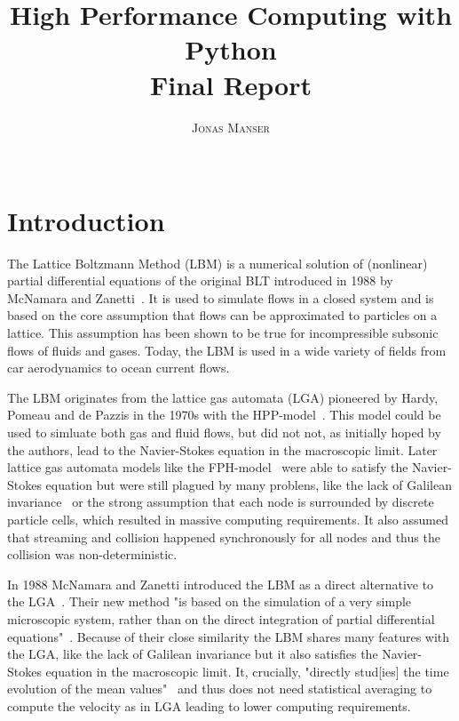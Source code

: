 \documentclass[a4paper,11pt, oneside]{book}
\title{\Huge \textbf{High Performance Computing with Python} \vspace{4mm} \\ \huge Final Report}
\author{\textsc{Jonas Manser} \\ \vspace{3mm}\text{4953222}  \\
\vspace{3mm}\text{jonas.burster@gmail.com}}
\begin{document}


\tableofcontents
\clearpage


\chapter{Introduction}
The Lattice Boltzmann Method (LBM) is a numerical solution of (nonlinear) partial differential equations of the original BLT introduced in 1988 by McNamara and Zanetti~\cite{mcnamara1988boltzmann-method}.
It is used to simulate flows in a closed system and is based on the core assumption that flows can be approximated to particles on a lattice.
This assumption has been shown to be true for incompressible subsonic flows of fluids and gases.
Today, the LBM is used in a wide variety of fields from car aerodynamics to ocean current flows.

The LBM originates from the lattice gas automata (LGA) pioneered by Hardy, Pomeau and de Pazzis in the 1970s with the HPP-model~\cite{hardy1973timeHPP}.
This model could be used to simluate both gas and fluid flows, but did not not, as initially hoped by the authors, lead to the Navier-Stokes equation in the macroscopic limit.
Later lattice gas automata models like the FPH-model~\cite{PhysRevLett.56.1505-fhp} were able to satisfy the Navier-Stokes equation but were still plagued by many problens, like the lack of Galilean invariance~\cite{nie2008galileanInvariance} or the strong assumption
that each node is surrounded by discrete particle cells, which resulted in massive computing requirements.
It also assumed that streaming and collision happened synchronously for all nodes and thus the collision was non-deterministic.

In 1988 McNamara and Zanetti introduced the LBM as a direct alternative to the LGA~\cite{mcnamara1988boltzmann-method}.
Their new method "is based on the simulation of a very simple microscopic system, rather than on the direct integration of partial differential equations"~\cite{mcnamara1988boltzmann-method}.
Because of their close similarity the LBM shares many features with the LGA, like the lack of Galilean invariance but it also satisfies the Navier-Stokes equation in the macroscopic limit.
It, crucially, "directly stud[ies] the time evolution of the mean values"~\cite{mcnamara1988boltzmann-method} and thus does not need statistical averaging to compute the velocity as in LGA leading to lower computing requirements.
\end{document}
